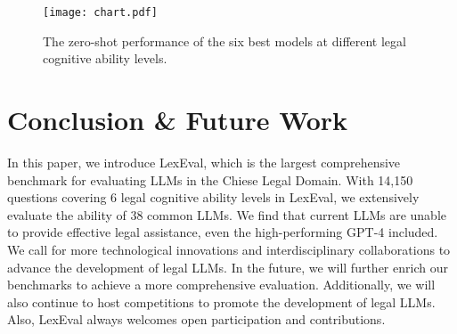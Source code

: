 \begin{figure}[t]
\vspace{-3mm}
\centering
\texttt{[image: chart.pdf]}
\vspace{-3mm}
\caption{The zero-shot performance of the six best models at different legal cognitive ability levels. }
\label{chart}
\vspace{-3mm}
\end{figure}

\section{Conclusion \& Future Work}

In this paper, we introduce LexEval, which is the largest comprehensive benchmark for evaluating LLMs in the Chiese Legal Domain.
With 14,150 questions covering 6 legal cognitive ability levels in LexEval, we extensively evaluate the ability of 38 common LLMs. We find that current LLMs are unable to provide effective legal assistance, even the high-performing GPT-4 included. 
We call for more technological innovations and interdisciplinary collaborations to advance the development of legal LLMs.
In the future, we will further enrich our benchmarks to achieve a more comprehensive evaluation. Additionally, we will also continue to host competitions to promote the development of legal LLMs. Also, LexEval always welcomes open participation and contributions.

\clearpage

\newpage
\clearpage

